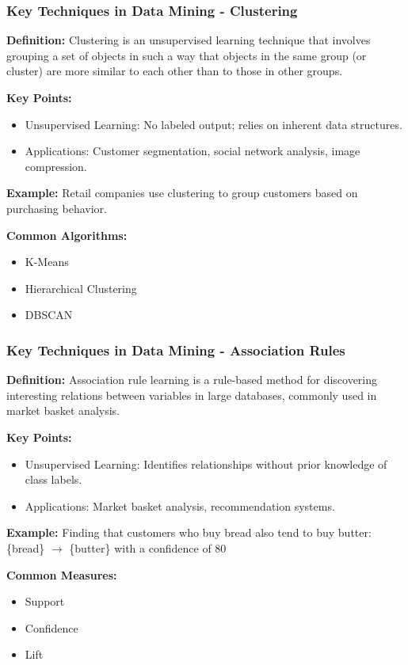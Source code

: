 \documentclass{beamer}
\begin{document}
\begin{frame}[fragile]
    \frametitle{Key Techniques in Data Mining - Clustering}
    \textbf{Definition:}  
    Clustering is an unsupervised learning technique that involves grouping a set of objects in such a way that objects in the same group (or cluster) are more similar to each other than to those in other groups.

    \textbf{Key Points:}
    \begin{itemize}
        \item Unsupervised Learning: No labeled output; relies on inherent data structures.
        \item Applications: Customer segmentation, social network analysis, image compression.
    \end{itemize}

    \textbf{Example:}  
    Retail companies use clustering to group customers based on purchasing behavior.

    \textbf{Common Algorithms:}  
    \begin{itemize}
        \item K-Means
        \item Hierarchical Clustering
        \item DBSCAN
    \end{itemize}
\end{frame}

\begin{frame}[fragile]
    \frametitle{Key Techniques in Data Mining - Association Rules}
    \textbf{Definition:}  
    Association rule learning is a rule-based method for discovering interesting relations between variables in large databases, commonly used in market basket analysis.

    \textbf{Key Points:}
    \begin{itemize}
        \item Unsupervised Learning: Identifies relationships without prior knowledge of class labels.
        \item Applications: Market basket analysis, recommendation systems.
    \end{itemize}

    \textbf{Example:}  
    Finding that customers who buy bread also tend to buy butter: 
    \{bread\} $\rightarrow$ \{butter\} with a confidence of 80%

    \textbf{Common Measures:}
    \begin{itemize}
        \item Support
        \item Confidence
        \item Lift
    \end{itemize}
\end{frame}
\end{document}
